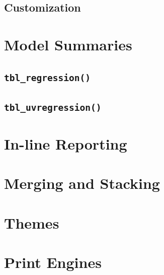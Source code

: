 \documentclass[
]{article}
\begin{document}
\hypertarget{customization}{%
\subsection{Customization}\label{customization}}

\hypertarget{model-summaries}{%
\section{Model Summaries}\label{model-summaries}}

\hypertarget{tbl_regression}{%
\subsection{\texorpdfstring{\texttt{tbl\_regression()}}{tbl\_regression()}}\label{tbl_regression}}

\hypertarget{tbl_uvregression}{%
\subsection{\texorpdfstring{\texttt{tbl\_uvregression()}}{tbl\_uvregression()}}\label{tbl_uvregression}}

\hypertarget{in-line-reporting}{%
\section{In-line Reporting}\label{in-line-reporting}}

\hypertarget{merging-and-stacking}{%
\section{Merging and Stacking}\label{merging-and-stacking}}

\hypertarget{themes}{%
\section{Themes}\label{themes}}

\hypertarget{print-engines}{%
\section{Print Engines}\label{print-engines}}
\end{document}
